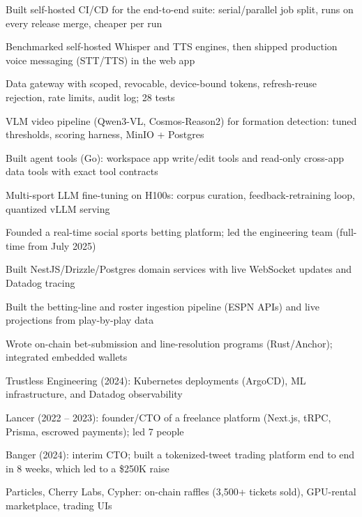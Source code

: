 \documentclass[print]{jack-resume}
\begin{document}
\begin{tightemize}
    \item Built self-hosted CI/CD for the end-to-end suite: serial/parallel job split, runs on every release merge, cheaper per run
    \item Benchmarked self-hosted Whisper and TTS engines, then shipped production voice messaging (STT/TTS) in the web app
    \item Data gateway with scoped, revocable, device-bound tokens, refresh-reuse rejection, rate limits, audit log; 28 tests
    \item VLM video pipeline (Qwen3-VL, Cosmos-Reason2) for formation detection: tuned thresholds, scoring harness, MinIO + Postgres
    \item Built agent tools (Go): workspace app write/edit tools and read-only cross-app data tools with exact tool contracts
    \item Multi-sport LLM fine-tuning on H100s: corpus curation, feedback-retraining loop, quantized vLLM serving
\end{tightemize}
\sectionsep

\begin{tightemize}
    \item Founded a real-time social sports betting platform; led the engineering team (full-time from July 2025)
    \item Built NestJS/Drizzle/Postgres domain services with live WebSocket updates and Datadog tracing
    \item Built the betting-line and roster ingestion pipeline (ESPN APIs) and live projections from play-by-play data
    \item Wrote on-chain bet-submission and line-resolution programs (Rust/Anchor); integrated embedded wallets
\end{tightemize}
\sectionsep

\begin{tightemize}
    \item Trustless Engineering (2024): Kubernetes deployments (ArgoCD), ML infrastructure, and Datadog observability
    \item Lancer (2022 – 2023): founder/CTO of a freelance platform (Next.js, tRPC, Prisma, escrowed payments); led 7 people
    \item Banger (2024): interim CTO; built a tokenized-tweet trading platform end to end in 8 weeks, which led to a \$250K raise
    \item Particles, Cherry Labs, Cypher: on-chain raffles (3,500+ tickets sold), GPU-rental marketplace, trading UIs
\end{tightemize}
\sectionsep
\end{document}
